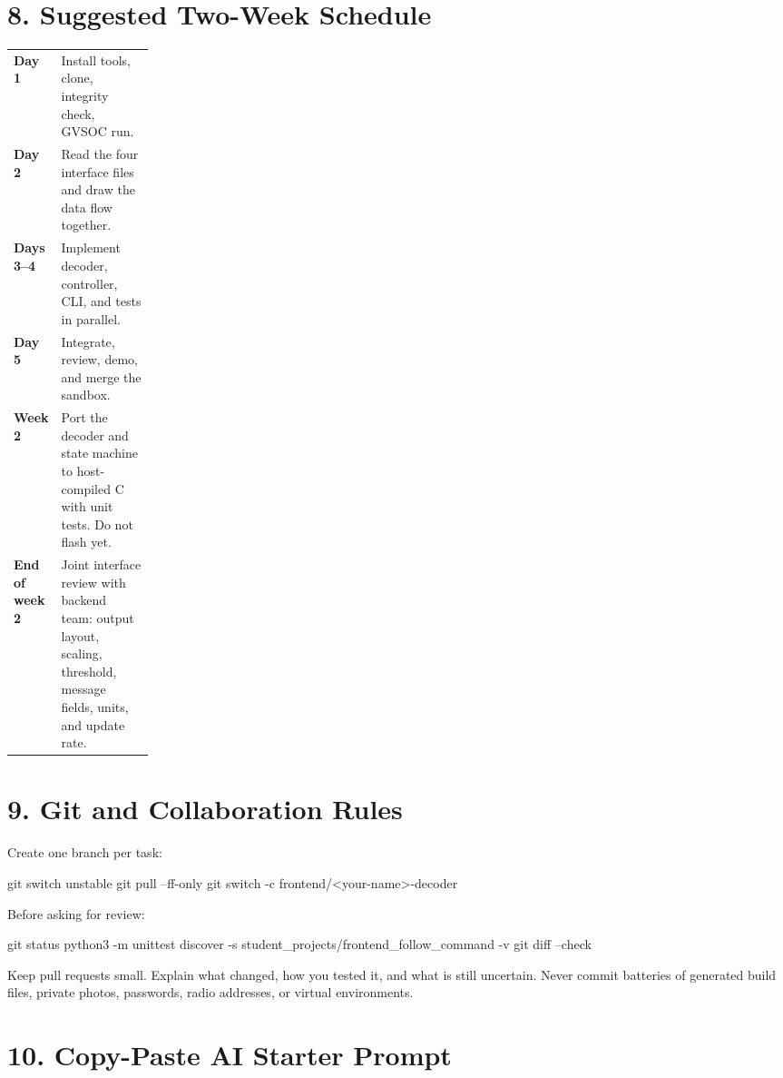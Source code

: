 \documentclass[11pt]{article}
\begin{document}
\section{8. Suggested Two-Week Schedule}

\begin{tabularx}{\linewidth}{>{\bfseries}p{0.18\linewidth}X}
Day 1 & Install tools, clone, integrity check, GVSOC run. \\
Day 2 & Read the four interface files and draw the data flow together. \\
Days 3--4 & Implement decoder, controller, CLI, and tests in parallel. \\
Day 5 & Integrate, review, demo, and merge the sandbox. \\
Week 2 & Port the decoder and state machine to host-compiled C with unit tests. Do not flash yet. \\
End of week 2 & Joint interface review with backend team: output layout, scaling, threshold, message fields, units, and update rate. \\
\end{tabularx}

\section{9. Git and Collaboration Rules}

Create one branch per task:

\begin{Code}
git switch unstable
git pull --ff-only
git switch -c frontend/<your-name>-decoder
\end{Code}

Before asking for review:

\begin{Code}
git status
python3 -m unittest discover -s student_projects/frontend_follow_command -v
git diff --check
\end{Code}

Keep pull requests small. Explain what changed, how you tested it, and what is still uncertain. Never commit batteries of generated build files, private photos, passwords, radio addresses, or virtual environments.

\section{10. Copy-Paste AI Starter Prompt}
\end{document}
